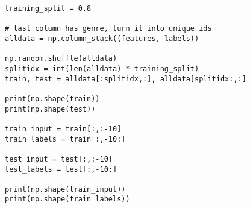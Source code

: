 \begin{verbatim}
training_split = 0.8

# last column has genre, turn it into unique ids
alldata = np.column_stack((features, labels))

np.random.shuffle(alldata)
splitidx = int(len(alldata) * training_split)
train, test = alldata[:splitidx,:], alldata[splitidx:,:]

print(np.shape(train))
print(np.shape(test))

train_input = train[:,:-10]
train_labels = train[:,-10:]

test_input = test[:,:-10]
test_labels = test[:,-10:]

print(np.shape(train_input))
print(np.shape(train_labels))
\end{verbatim}